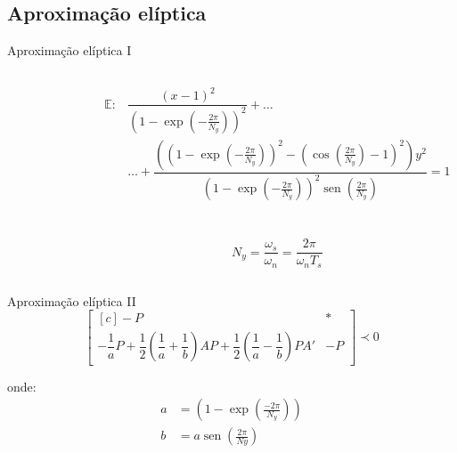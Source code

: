 \documentclass[aspectratio=169,11pt,t,xcolor={usenames,dvipsnames,x11names}]{beamer}
\DeclareMathOperator{\sen}{sen}
\begin{document}
\subsection{Aproximação elíptica}
\begin{frame}[c]{Aproximação elíptica I}
	\begin{columns}
		\begin{column}{0.3\textwidth}
			\begin{figure}[!ht]
				\centering
				
			\end{figure}
		\end{column}
		\begin{column}{0.7\textwidth}
		\small
			\begin{align*}
				\mathbb{E}: &\dfrac{(x-1)^2}{\left(1-\exp{\left(-\frac{2\pi}{N_y}\right)}\right)^2} +\dots\\
				&\dots+\dfrac{\left(\left(1-\exp{\left(-\frac{2\pi}{N_y}\right)}\right)^2 - \left(\cos{\left(\frac{2\pi}{N_y}\right)} - 1\right)^2\right)y^2}{\left(1-\exp{\left(-\frac{2\pi}{N_y}\right)}\right)^2\sen{\left(\frac{2\pi}{N_y}\right)}} = 1\label{eq:Elipse}
\end{align*}
			\\~\\\pause
			\begin{equation}
  				N_y = \dfrac{\omega_s}{\omega_n} = \dfrac{2\pi}{\omega_nT_s}\label{eq:ConstanteNy}
			\end{equation}
		\end{column}
	\end{columns}
\end{frame}

\begin{frame}[c]{Aproximação elíptica II}
	\begin{equation}
	  \begin{bmatrix*}[c]
	    -P & *\\
	    -\dfrac{1}{a}P + \dfrac{1}{2}\left(\dfrac{1}{a}+\dfrac{1}{b}\right)AP + \dfrac{1}{2}\left(\dfrac{1}{a}-\dfrac{1}{b}\right)PA' & -P
	  \end{bmatrix*}
	  \prec 0\label{eq:LMIElipse}
	\end{equation}
	
	\noindent onde:
	\begin{subequations}
	  \label{eq:PontosElipse}
	  \begin{align}
	    a &= \left(1-\exp{\left(\frac{-2\pi}{N_y}\right)}\right)\label{eq:PontoAElipse}\\
	    b &= a\sen{\left(\frac{2\pi}{Ny}\right)}\label{eq:PontoBElipse}
	  \end{align}
	\end{subequations}
\end{frame}
\end{document}
